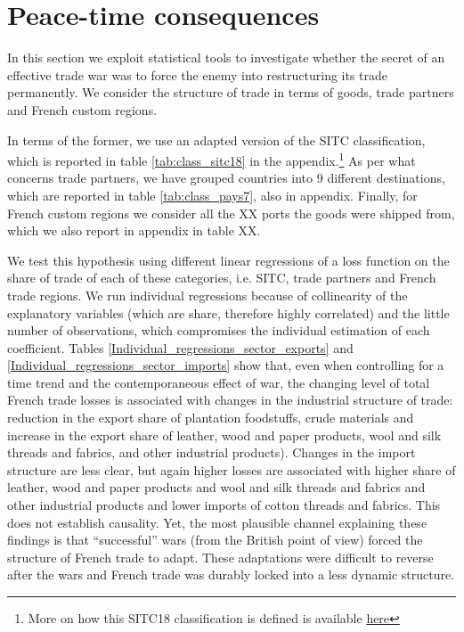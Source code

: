 \documentclass[12pt,a4paper,notitlepage,english]{article}
\begin{document}

\section{Peace-time consequences} \label{sec:empirical_analysis}

In this section we exploit statistical tools to investigate whether the secret of an effective trade war was to force the enemy into restructuring its trade permanently. 
We consider the structure of trade in terms of goods, trade partners and French custom regions. 

In terms of the former, we use an adapted version of the SITC classification, which is reported in table \ref{tab:class_sitc18} in the appendix.\footnote{More on how this SITC18 classification is defined is available \href{http://toflit18.medialab.sciences-po.fr/\#/home}{here}} As per what concerns trade partners, we have grouped countries into 9 different destinations, which are reported in table \ref{tab:class_pays7}, also in appendix. Finally, for French custom regions we consider all the XX ports the goods were shipped from, which we also report in appendix in table XX. 

We test this hypothesis using different linear regressions of a loss function on the share of trade of each of these categories, i.e. SITC, trade partners and French trade regions.
We run individual regressions because of collinearity of the explanatory variables (which are share, therefore highly correlated) and the little number of observations, which compromises the individual estimation of each coefficient.
Tables \ref{Individual_regressions_sector_exports} and \ref{Individual_regressions_sector_imports} show that, even when controlling for a time trend and the contemporaneous effect of war, the changing level of total French trade losses is associated with changes in the industrial structure of trade: reduction in the export share of plantation foodstuffs, crude materials and increase in the export share of leather, wood and paper products, wool and silk threads and fabrics, and other industrial products).
Changes in the import structure are less clear, but again higher losses are associated with higher share of leather, wood and paper products and wool and silk threads and fabrics and other industrial products and lower imports of cotton threads and fabrics.
This does not establish causality. Yet, the most plausible channel explaining these findings is that ``successful'' wars (from the British point of view) forced the structure of French trade to adapt.
These adaptations were difficult to reverse after the wars and French trade was durably locked into a less dynamic structure.
\end{document}
